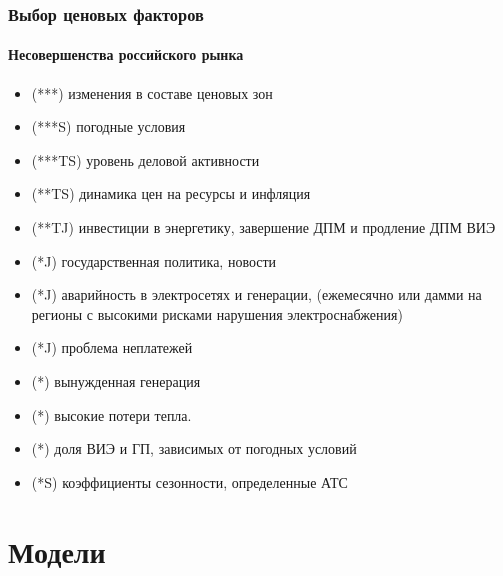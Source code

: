 \documentclass[c, dvipsnames]{beamer}  %
\begin{document}
\begin{frame}[shrink=5]
\frametitle{Выбор ценовых факторов } 
\framesubtitle{Несовершенства российского рынка} 

\begin{itemize}
	\item  (***)   изменения в составе ценовых зон
	\item  (***S)   погодные условия 
	\item  (***TS) уровень деловой активности  
	\item  (**TS) динамика цен на ресурсы и инфляция
	\item  (**TJ) инвестиции в энергетику, завершение ДПМ и продление ДПМ ВИЭ
	\item  (*J) государственная политика, новости
	\item  (*J) аварийность в электросетях и генерации, (ежемесячно или дамми на регионы с высокими рисками нарушения электроснабжения)
	\item  (*J) проблема неплатежей
	\item  (*) вынужденная генерация
	\item  (*) высокие потери тепла.
	\item  (*) доля ВИЭ и ГП, зависимых от погодных условий
	\item  (*S) коэффициенты сезонности, определенные АТС
\end{itemize}


\end{frame}


\section{Модели}
\end{document}
